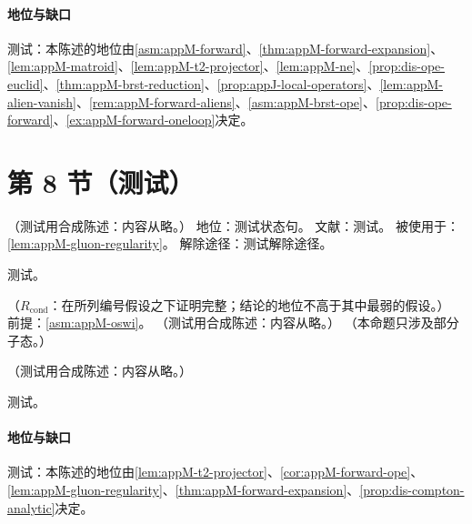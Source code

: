 \paragraph{地位与缺口}测试：本陈述的地位由\cref{asm:appM-forward}、\cref{thm:appM-forward-expansion}、\cref{lem:appM-matroid}、\cref{lem:appM-t2-projector}、\cref{lem:appM-ne}、\cref{prop:dis-ope-euclid}、\cref{thm:appM-brst-reduction}、\cref{prop:appJ-local-operators}、\cref{lem:appM-alien-vanish}、\cref{rem:appM-forward-aliens}、\cref{asm:appM-brst-ope}、\cref{prop:dis-ope-forward}、\cref{ex:appM-forward-oneloop}决定。

\section{第 8 节（测试）}\label{sec:appM-np}

\begin{assumption}\label{asm:appM-oswi}
（测试用合成陈述：内容从略。）
地位：测试状态句。
文献：测试。
被使用于：\cref{lem:appM-gluon-regularity}。
解除途径：测试解除途径。
\end{assumption}
\begin{proofsketch}测试。\end{proofsketch}

\begin{lemma}[由在壳 Ward 恒等式得到胶子靶在 $\omega=0$ 的正则性 \tagR]\label{lem:appM-gluon-regularity}
（$R_{\mathrm{cond}}$：在所列编号假设之下证明完整；结论的地位不高于其中最弱的假设。）
前提：\cref{asm:appM-oswi}。
（测试用合成陈述：内容从略。）
（本命题只涉及部分子态。）
\end{lemma}

\begin{corollary}\label{cor:appM-cut-plane}
（测试用合成陈述：内容从略。）
\end{corollary}
\begin{proofsketch}测试。\end{proofsketch}
\paragraph{地位与缺口}测试：本陈述的地位由\cref{lem:appM-t2-projector}、\cref{cor:appM-forward-ope}、\cref{lem:appM-gluon-regularity}、\cref{thm:appM-forward-expansion}、\cref{prop:dis-compton-analytic}决定。

